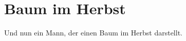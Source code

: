 \newpage
\section{Baum im Herbst}
\label{sec:baumimherbst}
\charaktere{\Baum}
\setting{-}
\hauptbeamer{-}
\sound{-}
\requisiten{-}

\begin{verseplay}[7em]
 Und nun ein Mann, der einen Baum im Herbst darstellt.
\end{verseplay}


